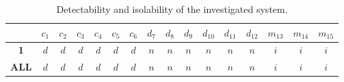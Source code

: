 \documentclass[a4,11pt]{article}
\begin{document}
\begin{table}[!htb]
\centering
\normalsize
\begin{tabular}{|c|c|c|c|c|c|c|c|c|c|c|c|c|c|c|c|}
\hline
~ & \textbf{$c_1$} & \textbf{$c_2$} & \textbf{$c_3$} & \textbf{$c_4$} & \textbf{$c_5$} & \textbf{$c_6$} & \textbf{$d_7$} & \textbf{$d_8$} & \textbf{$d_9$} & \textbf{$d_{10}$} & \textbf{$d_{11}$} & \textbf{$d_{12}$} & \textbf{$m_{13}$} & \textbf{$m_{14}$} & \textbf{$m_{15}$}\\ \hline 
\textbf{1} & $d$ & $d$ & $d$ & $d$ & $d$ & $d$ & $n$ & $n$ & $n$ & $n$ & $n$ & $n$ & $i$ & $i$ & $i$\\ \hline 
\textbf{ALL} & $d$ & $d$ & $d$ & $d$ & $d$ & $d$ & $n$ & $n$ & $n$ & $n$ & $n$ & $n$ & $i$ & $i$ & $i$\\ \hline 
\end{tabular}
\caption{Detectability and isolability of the investigated system.}
\label{tab:iso}
\end{table}
\end{document}
